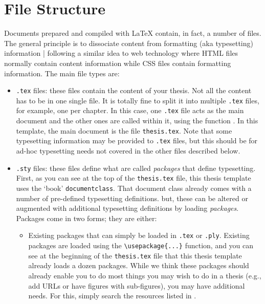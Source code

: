 \section{File Structure}

Documents prepared and compiled with \LaTeX{} contain, in fact, a number of files.
The general principle is to dissociate content from formatting (aka typesetting) information | following a similar idea to web technology where HTML files normally contain content information while CSS files contain formatting information. The main file types are:

\begin{itemize}
  \item \verb|.tex| files: these files contain the content of your thesis. Not all the content has to be in one single file. It is totally fine to split it into multiple \verb|.tex| files, for example, one per chapter. In this case, one \verb|.tex| file acts as the main document and the other ones are called within it, using the function \verb||. In this template, the main document is the file \verb|thesis.tex|.
  Note that some typesetting information may be provided to \verb|.tex| files, but this should be for ad-hoc typesetting needs not covered in the other files described below.
  
  \item \verb|.sty| files: these files define what are called \emph{packages} that define typesetting. First, as you can see at the top of the \verb|thesis.tex| file, this thesis template uses the `book' \verb|documentclass|. That document class already comes with a number of pre-defined typesetting definitions. but, these can be altered or augmented with additional typesetting definitions by loading \emph{packages}. Packages come in two forms; they are either:           
    \begin{itemize}
        \item Existing packages that can simply be loaded in \verb|.tex| or \verb|.ply|. Existing packages are loaded using the \verb|\usepackage{...}| function, and you can see at the beginning of the \verb|thesis.tex| file that this thesis template already loads a dozen packages. While we think these packages should already enable you to do most things you may wish to do in a thesis (e.g., add URLs or have figures with sub-figures), you may have additional needs. For this, simply search the resources listed in .
    \end{itemize}
  

\end{itemize}

